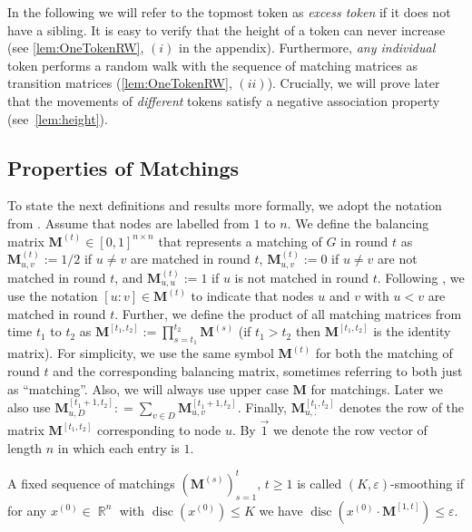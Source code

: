 \documentclass[twoside,leqno]{article}
\DeclareMathOperator{\R}{\mathbb{R}}
\newcommand{\M}{\mathbf{M}}
\DeclareMathOperator{\discr}{\mathrm{disc}}
\DeclareMathOperator{\1}{\mathbf{1}}
\numberwithin{equation}{section}
\let\epsilon\varepsilon
\begin{document}
\smallskip

In the following we will refer to  the topmost token as \emph{excess token} if it does not have a sibling.
It is easy to verify that the height of a token can never increase (see \cref{lem:OneTokenRW}, $(i)$ in the appendix).
Furthermore, \emph{any individual} token performs a random walk with the sequence of matching matrices as transition matrices (\cref{lem:OneTokenRW}, $(ii)$).
Crucially, we will prove later that the movements of \emph{different} tokens satisfy a negative association property (see~\cref{lem:height}).

\subsection{Properties of Matchings}
To state the next definitions and results more formally, we adopt the notation from \cite{DBLP:conf/focs/RabaniSW98}. Assume that nodes are labelled from $1$ to $n$. We define the balancing matrix $\M^{(t)} \in [0,1]^{n\times n}$ that represents a matching of $G$ in round $t$ as
$\M_{u,v}^{(t)}:=1/2$ if $u \neq v$ are matched in round $t$, $\M_{u,v}^{(t)}:=0$ if $u \neq v$ are not matched in round $t$, and $\M_{u,u}^{(t)}:=1$ if $u$ is not matched in round $t$. 
 Following \cite{DBLP:conf/focs/SauerwaldS12,DBLP:conf/focs/RabaniSW98}, we use the notation $[u:v]\in \M^{(t)}$ to indicate that nodes $u$ and $v$ with $u<v$ are matched in round $t$.
 Further, we define the product of all matching matrices from time $t_1$ to $t_2$ as
$\M^{[t_1,t_2]}:= \prod_{s=t_1}^{t_2}\M^{(s)}$ (if $t_1 > t_2$ then $\M^{[t_1,t_2]}$ is the identity matrix). For simplicity, we use the same symbol $\M^{(t)}$ for both the matching of round $t$ and the corresponding balancing matrix, sometimes referring to both just as ``matching''. Also, we will always use upper case $\M$ for matchings. Later we also use $\M^{[t_1+1,t_2]}_{u,D} : = \sum_{v\in D} \M^{[t_1+1,t_2]}_{u,v}$. Finally, $\M^{[t_1,t_2]}_{u,.}$ denotes the row of the matrix $\M^{[t_1,t_2]}$ corresponding to node $u$. 
By $\vec{1}$ we denote the row vector of length $n$ in which each entry is $1$.




\begin{definition}\label{def:smoothing}
A fixed sequence of matchings $\left(\M^{(s)}\right)_{s=1}^{t}$, $t \geq 1$ is called $(K,\epsilon)$-smoothing if for any $x^{(0)}\in\R^{n}$ with $\discr(x^{(0)})\le K$
we have $\discr(x^{(0)}\cdot \M^{[1,t]})\le \epsilon$.
\end{definition}
\end{document}
